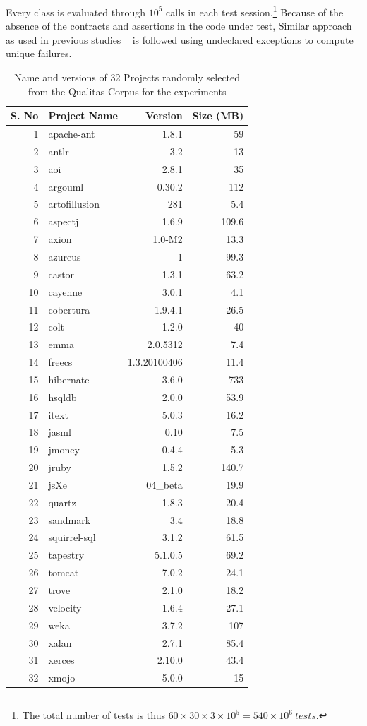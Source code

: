 \documentclass{acm_proc_article-sp}
\begin{document}
Every class is evaluated through $10^5$ calls in each test session.\footnote{The total number of tests is thus $60\times 30\times 3 \times 10^5 = 540\times 10^6~tests$.} 
Because of the absence of the contracts and assertions in the code under test, Similar approach as used in previous studies ~\cite{Oriol2012} is followed using undeclared exceptions to compute unique failures.


\begin{table}[h]
\caption{Name and versions of 32 Projects randomly selected from the Qualitas Corpus for the experiments}
\centering
\begin{tabular}{|r|l|r|r|}
\hline
S. No& 	Project Name	& 	Version		&	Size (MB)\\
\hline
1	&	apache-ant	&	1.8.1			&	59\\
2	&	antlr			&	3.2			&	13\\
3	&	aoi			&	2.8.1			&	35\\
4	&	argouml		&	0.30.2		&	112\\
5	&	artofillusion	&	281			&	5.4\\
6	&	aspectj		&	1.6.9			&	109.6\\
7	&	axion		&	1.0-M2		&	13.3\\
8	&	azureus		&	1			&	99.3\\
9	&	castor		&	1.3.1			&	63.2\\
10	&	cayenne		&	3.0.1			&	4.1\\
11	&	cobertura		&	1.9.4.1		&	26.5\\
12	&	colt			&	1.2.0			&	40\\
13	&	emma		&	2.0.5312		&	7.4\\
14	&	freecs		&	1.3.20100406	&	11.4\\
15	&	hibernate		&	3.6.0			&	733\\
16	&	hsqldb		&	2.0.0			&	53.9\\
17	&	itext			&	5.0.3			&	16.2\\
18	&	jasml		&	0.10			&	7.5 \\
19	&	jmoney		&	0.4.4			&	5.3\\
20	&	jruby			&	1.5.2			&	140.7\\
21	&	jsXe			&	04\_beta		&	19.9\\
22	&	quartz		&	1.8.3			&	20.4\\
23	&	sandmark		&	3.4			&	18.8\\
24	&	squirrel-sql	&	3.1.2			&	61.5\\
25	&	tapestry		&	5.1.0.5		&	69.2\\
26	&	tomcat		&	7.0.2			&	24.1\\
27	&	trove			&	2.1.0			&	18.2\\
28	&	velocity		&	1.6.4			&	27.1\\
29	&	weka		&	3.7.2			&	107\\
30	&	xalan		&	2.7.1			&	85.4\\
31	&	xerces		&	2.10.0		&	43.4\\
32	&	xmojo		&	5.0.0			&	15\\
\hline
\end{tabular}
\bigskip
\label{table:projects}
\end{table}
\end{document}
